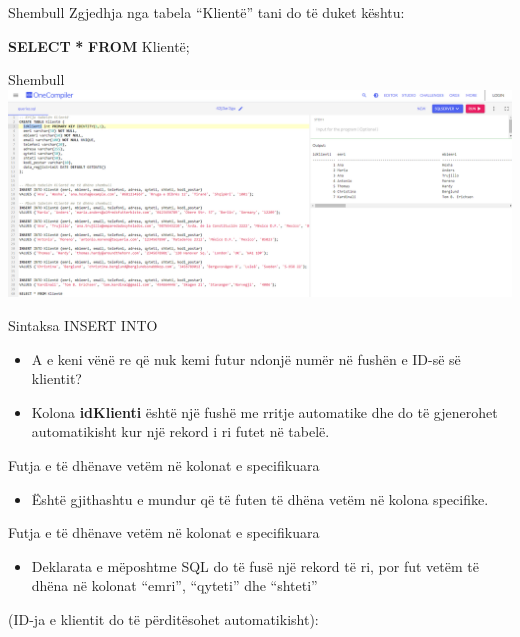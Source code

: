\documentclass[
  ignorenonframetext,
]{beamer}
\newenvironment{Shaded}{\begin{snugshade}}{\end{snugshade}}
\newcommand{\KeywordTok}[1]{\textcolor[rgb]{0.13,0.29,0.53}{\textbf{#1}}}
\newcommand{\NormalTok}[1]{#1}
\newcommand{\OperatorTok}[1]{\textcolor[rgb]{0.81,0.36,0.00}{\textbf{#1}}}
\providecommand{\tightlist}{%
  \setlength{\itemsep}{0pt}\setlength{\parskip}{0pt}}
\begin{document}
\begin{frame}[fragile]{Shembull}
\label{shembull-2}
Zgjedhja nga tabela ``Klientë'' tani do të duket kështu:

\begin{Shaded}
\begin{Highlighting}[]
\KeywordTok{SELECT} \OperatorTok{*} \KeywordTok{FROM}\NormalTok{ Klientë;}
\end{Highlighting}
\end{Shaded}
\end{frame}

\begin{frame}{Shembull}
\label{shembull-3}
\includegraphics{./Figs/query30.png}
\end{frame}

\begin{frame}{Sintaksa INSERT INTO}
\label{sintaksa-insert-into-3}
\begin{itemize}
\item
  A e keni vënë re që nuk kemi futur ndonjë numër në fushën e ID-së së
  klientit?
\item
  Kolona \textbf{idKlienti} është një fushë me rritje automatike dhe do
  të gjenerohet automatikisht kur një rekord i ri futet në tabelë.
\end{itemize}
\end{frame}

\begin{frame}{Futja e të dhënave vetëm në kolonat e specifikuara}
\label{futja-e-tuxeb-dhuxebnave-vetuxebm-nuxeb-kolonat-e-specifikuara}
\begin{itemize}
\tightlist
\item
  Është gjithashtu e mundur që të futen të dhëna vetëm në kolona
  specifike.
\end{itemize}
\end{frame}

\begin{frame}{Futja e të dhënave vetëm në kolonat e specifikuara}
\label{futja-e-tuxeb-dhuxebnave-vetuxebm-nuxeb-kolonat-e-specifikuara-1}
\begin{itemize}
\tightlist
\item
  Deklarata e mëposhtme SQL do të fusë një rekord të ri, por fut vetëm
  të dhëna në kolonat ``emri'', ``qyteti'' dhe ``shteti''
\end{itemize}

(ID-ja e klientit do të përditësohet automatikisht):
\end{frame}
\end{document}
